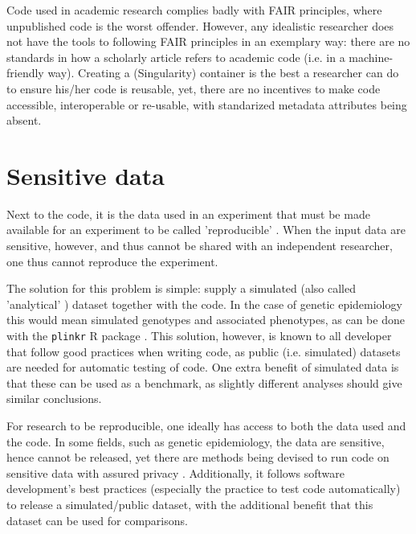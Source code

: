 Code used in academic research complies badly with FAIR principles,
where unpublished code is the worst offender.
However, any idealistic researcher does not have the
tools to following FAIR principles in an exemplary way:
there are no standards in how a scholarly article
refers to academic code (i.e. in a machine-friendly way).
Creating a (Singularity) container is the best a researcher
can do to ensure his/her code is reusable,
yet, there are no incentives to make code accessible, interoperable
or re-usable, with standarized metadata attributes being absent.

\section{Sensitive data}\label{sec:sensitive-data}

Next to the code, it is the data used in an experiment 
that must be made available for an experiment 
to be called 'reproducible' \cite{peng2006reproducible}.
When the input data are sensitive, however, and thus cannot be shared with
an independent researcher, one thus cannot reproduce the
experiment.

The solution for this problem is simple:
supply a simulated (also called 'analytical' \cite{peng2006reproducible}) dataset
together with the code.
In the case of genetic epidemiology this would mean
simulated genotypes and associated phenotypes,
as can be done with the \verb|plinkr| R package \cite{plinkr}.
This solution, however, is known to all developer that follow
good practices when writing code, as public (i.e. simulated) 
datasets are needed for automatic testing of code.
One extra benefit of simulated data is that these can be used
as a benchmark, as slightly different analyses should give 
similar conclusions.

For research to be reproducible, one ideally has access to
both the data used and the code.
In some fields, such as genetic epidemiology, the data are
sensitive, hence cannot be released,
yet there are methods being devised to run code on sensitive
data with assured privacy \cite{zhang2016review,azencott2018machine}.
Additionally, it follows software development's best practices 
(especially the practice to test code automatically) 
to release a simulated/public dataset, with
the additional benefit that this dataset can be used for comparisons.

